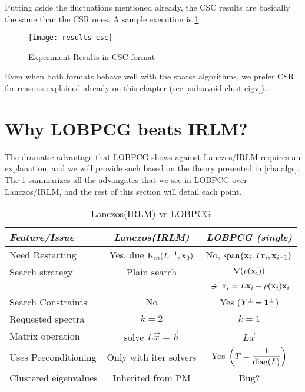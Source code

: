 Putting aside the fluctuations mentioned already, the CSC results are
basically the same than the CSR ones. A sample execution is
\cref{fig:exper-csc}. 

\begin{figure}[H]
  \centering
  \caption{Experiment Results in CSC format}
  \label{fig:exper-csc}  
  \texttt{[image: results-csc]}
\end{figure}

Even when both formats behave well with the sparse algorithms, we
prefer CSR for reasons explained already on this chapter (see
\cref{sub:avoid-clust-eigv}). 

\section{Why \gls{LOBPCG} beats \gls{IRLM}?}
\label{sec:why-lobpcg}

The dramatic advantage that \gls{LOBPCG} shows against
Lanczos/\gls{IRLM} requires an explanation, and we will provide such
based on the theory presented in \cref{cha:algs}. The
\cref{tab:lanczos-vs-lobpcg} summarizes all the advangates 
that we see in \gls{LOBPCG} over Lanczos/\gls{IRLM}, and the rest of
this section will detail each point.

\begin{table}[h]  
  \caption{Lanczos(IRLM) vs LOBPCG}
  \label{tab:lanczos-vs-lobpcg}
  \begin{tabular}{| l | c | c | }
    \hline
    \emph{Feature/Issue} & \emph{Lanczos(IRLM)} & \emph{LOBPCG (single)} \\
    \hline \hline
    Need Restarting &
    Yes, due $\Krylov{\inv{L}}{\vec{x}_0}{m}$ &
    No, $\func{span} \{\vec{x}_i, T\vec{r}_i, \vec{x}_{i-1}\}$ \\
    \hline
    Search strategy &
    Plain search &
    $\nabla (\func{\rho}(\vec{x_i}))$ \\
    &
    &
    $\suchthat \vec{r}_i = L\vec{x}_i - \func{\rho}(\vec{x}_i)\vec{x}_i$\\
    \hline
    Search Constraints &
    No &
    Yes ($\ortc{Y} = \ortc{\vec{1}}$) \\
    \hline
    Requested spectra &
    $k=2$ &
    $k=1$ \\      
    \hline
    Matrix operation &
    solve $L\vec{x} = \vec{b}$ &
    $L\vec{x}$ \\
    \hline      
    Uses Preconditioning &
    Only with iter solvers &
    Yes $\left(T = \dfrac{1}{\func{diag}(L)} \right)$ \\
    \hline
    Clustered eigenvalues &
    Inherited from PM &
    Bug? \\      
    \hline
  \end{tabular}
\end{table}

